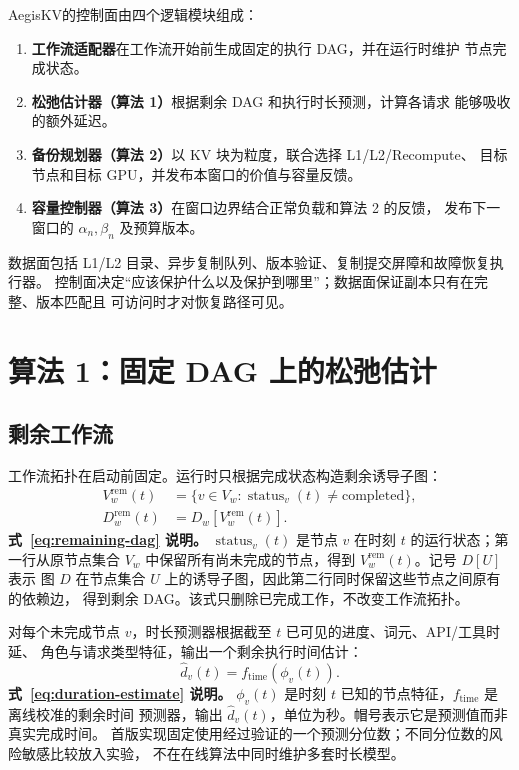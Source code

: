\documentclass[UTF8,11pt,a4paper,fontset=fandol]{ctexart}
\newcommand{\AegisKV}{AegisKV}
\begin{document}
\AegisKV 的控制面由四个逻辑模块组成：

\begin{enumerate}
  \item \textbf{工作流适配器}在工作流开始前生成固定的执行 DAG，并在运行时维护
    节点完成状态。
  \item \textbf{松弛估计器（算法 1）}根据剩余 DAG 和执行时长预测，计算各请求
    能够吸收的额外延迟。
  \item \textbf{备份规划器（算法 2）}以 KV 块为粒度，联合选择 L1/L2/Recompute、
    目标节点和目标 GPU，并发布本窗口的价值与容量反馈。
  \item \textbf{容量控制器（算法 3）}在窗口边界结合正常负载和算法 2 的反馈，
    发布下一窗口的 $\alpha_n,\beta_n$ 及预算版本。
\end{enumerate}

数据面包括 L1/L2 目录、异步复制队列、版本验证、复制提交屏障和故障恢复执行器。
控制面决定“应该保护什么以及保护到哪里”；数据面保证副本只有在完整、版本匹配且
可访问时才对恢复路径可见。

\section{算法 1：固定 DAG 上的松弛估计}

\subsection{剩余工作流}

工作流拓扑在启动前固定。运行时只根据完成状态构造剩余诱导子图：
\begin{equation}
  \begin{aligned}
    V_w^{\mathrm{rem}}(t)
      &=\{v\in V_w:\operatorname{status}_v(t)\neq\mathrm{completed}\},\\
    D_w^{\mathrm{rem}}(t)
      &=D_w[V_w^{\mathrm{rem}}(t)].
  \end{aligned}
  \label{eq:remaining-dag}
\end{equation}
\noindent\textbf{式~\eqref{eq:remaining-dag} 说明。}
$\operatorname{status}_v(t)$ 是节点 $v$ 在时刻 $t$ 的运行状态；第一行从原节点集合
$V_w$ 中保留所有尚未完成的节点，得到 $V_w^{\mathrm{rem}}(t)$。记号 $D[U]$ 表示
图 $D$ 在节点集合 $U$ 上的诱导子图，因此第二行同时保留这些节点之间原有的依赖边，
得到剩余 DAG。该式只删除已完成工作，不改变工作流拓扑。

对每个未完成节点 $v$，时长预测器根据截至 $t$ 已可见的进度、词元、API/工具时延、
角色与请求类型特征，输出一个剩余执行时间估计：
\begin{equation}
  \widehat d_v(t)=f_{\mathrm{time}}\!\left(\phi_v(t)\right).
  \label{eq:duration-estimate}
\end{equation}
\noindent\textbf{式~\eqref{eq:duration-estimate} 说明。}
$\phi_v(t)$ 是时刻 $t$ 已知的节点特征，$f_{\mathrm{time}}$ 是离线校准的剩余时间
预测器，输出 $\widehat d_v(t)$，单位为秒。帽号表示它是预测值而非真实完成时间。
首版实现固定使用经过验证的一个预测分位数；不同分位数的风险敏感比较放入实验，
不在在线算法中同时维护多套时长模型。
\end{document}
